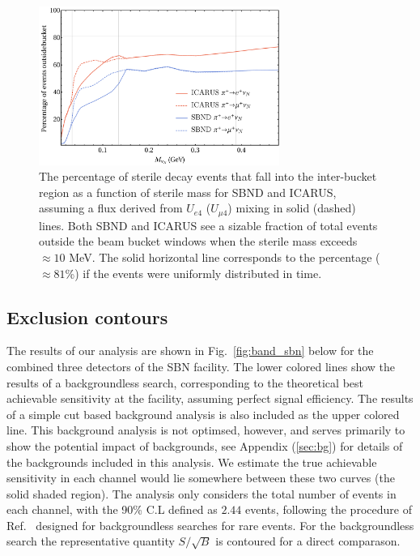 \documentclass[11pt, a4paper]{article}
\newcommand{\reffig}[1]{Fig.~\ref{#1}}
\newcommand{\refref}[1]{Ref.~\cite{#1}}
\begin{document}
\begin{figure}[t]
%
\center
%
\includegraphics[width=0.7\textwidth]{figures/line_plots.pdf}
%
\caption{\label{fig:timing_line} The percentage of sterile decay events that
fall into the inter-bucket region as a function of sterile mass for SBND and
ICARUS, assuming a flux derived from $U_{e4}$ ($U_{\mu 4}$) mixing in solid
(dashed) lines. Both SBND and ICARUS see a sizable fraction of total events
outside the beam bucket windows when the sterile mass exceeds $\approx10$ MeV.
The solid horizontal line corresponds to the percentage ($\approx 81$\%) if the
events were uniformly distributed in time.   }
%
\end{figure}

\subsection{Exclusion contours\label{sec:sensitivity}}
%
The results of our analysis are shown in \reffig{fig:band_sbn} below for the
combined three detectors of the SBN facility. The lower colored lines show the
results of a backgroundless search, corresponding to the theoretical best
achievable sensitivity at the facility, assuming perfect signal efficiency. The
results of a simple cut based background analysis is also included as the upper
colored line. This background analysis is not optimsed, however, and serves
primarily to show the potential impact of backgrounds, see Appendix
(\ref{sec:bg}) for details of the backgrounds included in this analysis. We
estimate the true achievable sensitivity in each channel would lie somewhere
between these two curves (the solid shaded region). The analysis only considers
the total number of events in each channel, with the 90\% C.L defined as $2.44$
events, following the procedure of \refref{Feldman:1997qc} designed for
backgroundless searches for rare events. For the backgroundless search the
representative quantity $S/\sqrt{B}$ is contoured for a direct comparason.  \\
\end{document}
